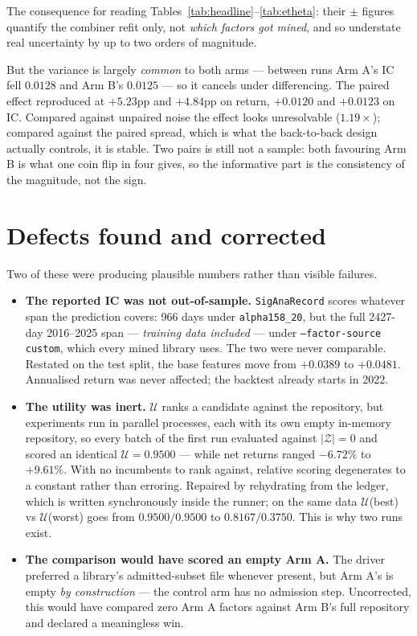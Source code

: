 \documentclass[11pt,a4paper]{article}
\newcommand{\util}{\mathcal{U}}
\begin{document}
\vspace{-0.4em}
The consequence for reading Tables~\ref{tab:headline}--\ref{tab:etheta}: their
$\pm$ figures quantify the combiner refit only, not \emph{which factors got
mined}, and so understate real uncertainty by up to two orders of magnitude.

But the variance is largely \emph{common} to both arms --- between runs Arm A's
IC fell $0.0128$ and Arm B's $0.0125$ --- so it cancels under differencing. The
paired effect reproduced at $+5.23$pp and $+4.84$pp on return, $+0.0120$ and
$+0.0123$ on IC. Compared against unpaired noise the effect looks unresolvable
($1.19\times$); compared against the paired spread, which is what the
back-to-back design actually controls, it is stable. Two pairs is still not a
sample: both favouring Arm B is what one coin flip in four gives, so the
informative part is the consistency of the magnitude, not the sign.

\section{Defects found and corrected}
\label{sec:defects}

Two of these were producing plausible numbers rather than visible failures.

\begin{itemize}\itemsep3pt\parskip0pt
  \item \textbf{The reported IC was not out-of-sample.} \texttt{SigAnaRecord}
        scores whatever span the prediction covers: 966 days under
        \texttt{alpha158\_20}, but the full 2427-day 2016--2025 span ---
        \emph{training data included} --- under \texttt{--factor-source custom},
        which every mined library uses. The two were never comparable. Restated
        on the test split, the base features move from $+0.0389$ to $+0.0481$.
        Annualised return was never affected; the backtest already starts in
        2022.

  \item \textbf{The utility was inert.} $\util$ ranks a candidate against the
        repository, but experiments run in parallel processes, each with its own
        empty in-memory repository, so every batch of the first run evaluated
        against $|\mathcal{Z}|=0$ and scored an identical $\util=0.9500$ ---
        while net returns ranged $-6.72\%$ to $+9.61\%$. With no incumbents to
        rank against, relative scoring degenerates to a constant rather than
        erroring. Repaired by rehydrating from the ledger, which is written
        synchronously inside the runner; on the same data $\util$(best) vs
        $\util$(worst) goes from $0.9500/0.9500$ to $0.8167/0.3750$. This is why
        two runs exist.

  \item \textbf{The comparison would have scored an empty Arm A.} The driver
        preferred a library's admitted-subset file whenever present, but Arm A's
        is empty \emph{by construction} --- the control arm has no admission
        step. Uncorrected, this would have compared zero Arm A factors against
        Arm B's full repository and declared a meaningless win.
\end{itemize}
\end{document}
